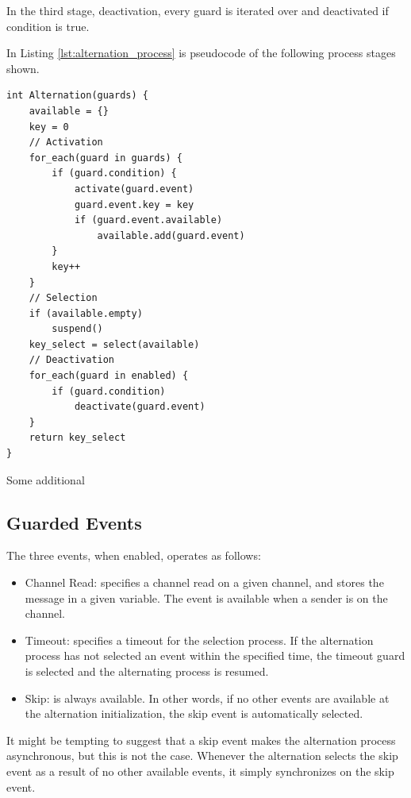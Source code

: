 In the third stage, deactivation, every guard is iterated over and deactivated if condition is true.

In Listing \ref{lst:alternation_process} is pseudocode of the following process stages shown.

\begin{lstlisting}[style=CustomC,caption={Pseudocode of alternation process},label={lst:alternation_process}]
int Alternation(guards) {
	available = {}
	key = 0
	// Activation
	for_each(guard in guards) {
		if (guard.condition) {
			activate(guard.event)
			guard.event.key = key
			if (guard.event.available) 
				available.add(guard.event)
		}
		key++
	}
	// Selection
	if (available.empty)
		suspend()
	key_select = select(available)
	// Deactivation
	for_each(guard in enabled) {
	    if (guard.condition)
    		deactivate(guard.event)
	}
	return key_select
}
\end{lstlisting}

Some additional 

\subsection{Guarded Events}

The three events, when enabled, operates as follows:

\begin{itemize}[topsep=0em,itemsep=-1em,partopsep=0.5em,parsep=1em]
    \item Channel Read: specifies a channel read on a given channel, and stores the message in a given variable. The event is available when a sender is on the channel. 
    
    \item Timeout: specifies a timeout for the selection process. If the alternation process has not selected an event within the specified time, the timeout guard is selected and the alternating process is resumed. 
    
    \item Skip: is always available. In other words, if no other events are available at the alternation initialization, the skip event is automatically selected. 
\end{itemize}

It might be tempting to suggest that a skip event makes the alternation process asynch\-ronous, but this is not the case. Whenever the alternation selects the skip event as a result of no other available events, it simply synchronizes on the skip event. 

